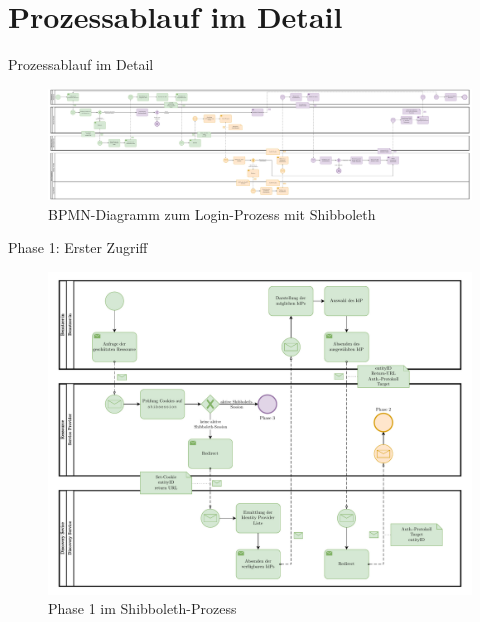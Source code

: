 
\section{Prozessablauf im Detail}

\begin{frame}{Prozessablauf im Detail}
    \begin{figure}
        \includegraphics[width=\textwidth]{../assets/bis_bpmn.drawio.pdf}
        \caption{BPMN-Diagramm zum Login-Prozess mit Shibboleth~\cite[vgl.][]{switchExpertDemoSWITCHaai2024a}}
    \end{figure}        
\end{frame}


\begin{frame}{Phase 1: Erster Zugriff}

    \begin{figure}
        \includegraphics[height=0.7\paperheight]{../assets/bis_bpmn_phase_1.drawio.pdf}
        \caption{Phase 1 im Shibboleth-Prozess~\cite[vgl.][]{switchExpertDemoSWITCHaai2024a}}
    \end{figure}
\end{frame}


